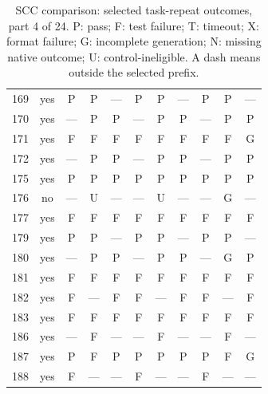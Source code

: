 \begin{table}[p]
\begin{tabular*}{\textwidth}{@{\extracolsep{\fill}}rc*{9}{c}@{}}
169 & yes & P & P & — & P & P & — & P & P & —\\
170 & yes & — & P & P & — & P & P & — & P & P\\
171 & yes & F & F & F & F & F & F & F & F & G\\
172 & yes & — & P & P & — & P & P & — & P & P\\
175 & yes & P & P & P & P & P & P & P & P & P\\
176 & no & — & U & — & — & U & — & — & G & —\\
177 & yes & F & F & F & F & F & F & F & F & F\\
179 & yes & P & P & — & P & P & — & P & P & —\\
180 & yes & — & P & P & — & P & P & — & G & P\\
181 & yes & F & F & F & F & F & F & F & F & F\\
182 & yes & F & — & F & F & — & F & F & — & F\\
183 & yes & F & F & F & F & F & F & F & F & F\\
186 & yes & — & F & — & — & F & — & — & F & —\\
187 & yes & P & F & P & P & P & P & P & F & G\\
188 & yes & F & — & — & F & — & — & F & — & —\\
\bottomrule\end{tabular*}
\caption{SCC comparison: selected task-repeat outcomes, part 4 of 24. P: pass; F: test failure; T: timeout; X: format failure; G: incomplete generation; N: missing native outcome; U: control-ineligible. A dash means outside the selected prefix.}
\end{table}
\clearpage
